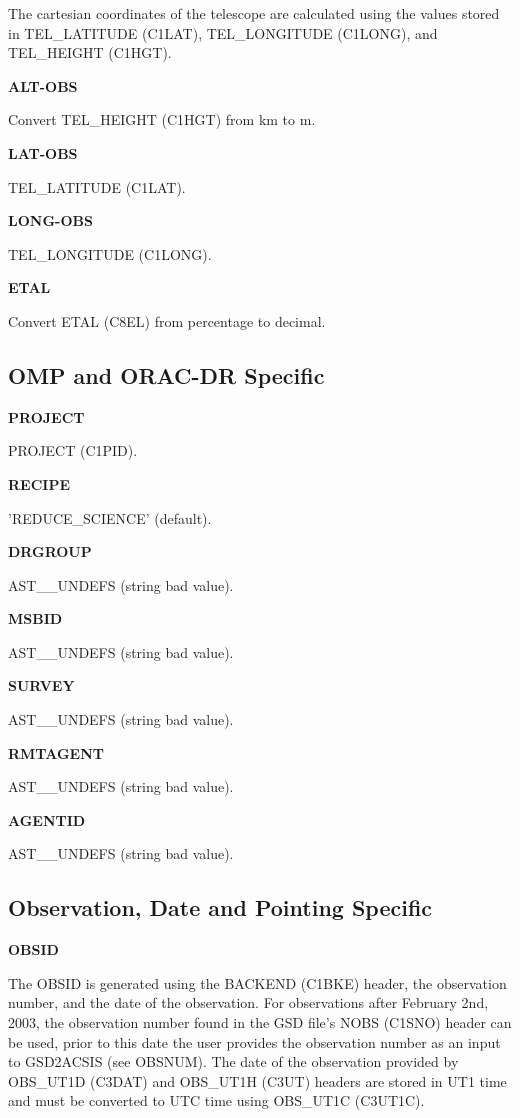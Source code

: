 \documentclass[twoside,11pt,nolof]{starlink}
\providecommand{\project}{PROJECT (C1PID)}
\providecommand{\telHeight}{TEL\_HEIGHT (C1HGT)}
\providecommand{\telLongitude}{TEL\_LONGITUDE (C1LONG)}
\providecommand{\telLatitude}{TEL\_LATITUDE (C1LAT)}
\providecommand{\nObs}{NOBS (C1SNO)}
\providecommand{\backend}{BACKEND (C1BKE)}
\providecommand{\obsUTd}{OBS\_UT1D (C3DAT)}
\providecommand{\obsUTh}{OBS\_UT1H (C3UT)}
\providecommand{\obsUTC}{OBS\_UT1C (C3UT1C)}
\providecommand{\etal}{ETAL (C8EL)}
\begin{document}
The cartesian coordinates of the telescope are calculated using the values stored in \telLatitude, \telLongitude, and \telHeight.

\textbf{ALT-OBS}

Convert \telHeight{} from km to m.

\textbf{LAT-OBS}

\telLatitude.

\textbf{LONG-OBS}

\telLongitude.

\textbf{ETAL}

Convert \etal{} from percentage to decimal.

\subsection{OMP and ORAC-DR Specific}

\textbf{PROJECT}

\project.

\textbf{RECIPE}

'REDUCE\_SCIENCE' (default).

\textbf{DRGROUP}

AST\_\_UNDEFS (string bad value).

\textbf{MSBID}

AST\_\_UNDEFS (string bad value).

\textbf{SURVEY}

AST\_\_UNDEFS (string bad value).

\textbf{RMTAGENT}

AST\_\_UNDEFS (string bad value).

\textbf{AGENTID}

AST\_\_UNDEFS (string bad value).

\subsection{Observation, Date and Pointing Specific}

\textbf{OBSID}

The OBSID is generated using the \backend{} header, the observation number, and the date of the observation.  For observations after February 2nd, 2003, the observation number found in the GSD file's \nObs{} header can be used, prior to this date the user provides the observation number as an input to GSD2ACSIS (see OBSNUM).  The date of the observation provided by \obsUTd{} and \obsUTh{} headers are stored in UT1 time and must be converted to UTC time using \obsUTC.
\end{document}
